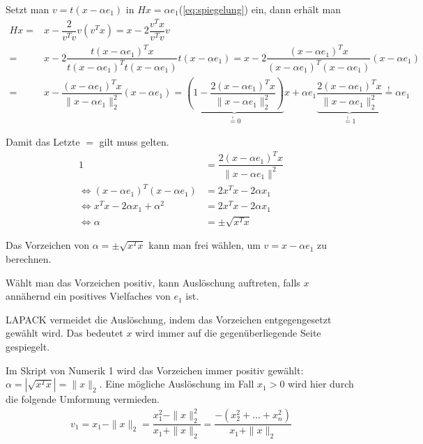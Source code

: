 Setzt man $v = t(x - \alpha e_1)$ in $Hx = \alpha e_1 $(\ref{eq:spiegelung}) ein, dann erhält man 
\begin{align*}
Hx =& x - \dfrac{2}{v^Tv}v(v^Tx) = x - 2\dfrac{v^Tx}{v^Tv}v\\
=& x - 2\dfrac{ t(x - \alpha e_1)^Tx}{ t(x - \alpha e_1)^T t(x - \alpha e_1)} t(x - \alpha e_1)
= x - 2\dfrac{ (x - \alpha e_1)^Tx}{ (x - \alpha e_1)^T (x - \alpha e_1)} (x - \alpha e_1)
\\
=& x - \dfrac{(x - \alpha e_1)^Tx}{\|x - \alpha e_1\|_2^2} (x - \alpha e_1)
=\underbrace{\left(1 - \dfrac{2(x - \alpha e_1)^Tx}{\|x - \alpha e_1\|_2^2}\right)}_{ \overset{!}{=} 0 } x + \alpha e_1 \underbrace{\dfrac{2(x - \alpha e_1)^Tx}{\|x - \alpha e_1\|_2^2} }_{\overset{!}{=} 1} \overset{!}{=} \alpha e_1
\end{align*}

Damit das Letzte $=$ gilt muss gelten.
\begin{align*}
	1 &= \dfrac{2(x - \alpha e_1)^Tx}{\|x - \alpha e_1\|^2}\\
	\Leftrightarrow (x - \alpha e_1)^T(x - \alpha e_1) &= 2 x^T x - 2\alpha x_1 \\
	\Leftrightarrow x^Tx -2\alpha x_1 + \alpha^2 &= 2 x^T x - 2\alpha x_1\\
	\Leftrightarrow \alpha &= \pm \sqrt{x^Tx}
\end{align*}

Das Vorzeichen von  $\alpha = \pm \sqrt{x^Tx}$ kann man frei wählen, um $ v = x - \alpha e_1$ zu berechnen.

Wählt man das Vorzeichen positiv, kann Auslöschung auftreten, falls $x$ annähernd ein positives Vielfaches von $e_1$ ist.

LAPACK \cite{DGEQR2} vermeidet die Auslöschung, indem das Vorzeichen entgegengesetzt gewählt wird. Das bedeutet $x$ wird immer auf die gegenüberliegende Seite gespiegelt.

Im Skript von Numerik 1 \cite{num1} wird das Vorzeichen immer positiv gewählt:\\ $\alpha = |\sqrt{x^Tx}| = \|x\|_2$. Eine mögliche Auslöschung im Fall $ x_1 > 0$ wird hier durch die folgende Umformung vermieden.
\begin{align*}
	v_1 = x_1 - \|x\|_2 = \dfrac{x_1^2 - \|x\|_2^2}{x_1 + \|x\|_2}
	=\dfrac{-(x_2^2+...+x_n^2)}{x_1 + \|x\|_2}
\end{align*}


